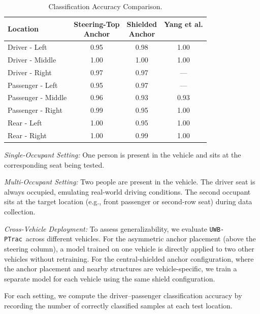 \documentclass[sigconf]{acmart}
\newcommand{\edited}[1]{#1}
\newcommand{\name}{{{\tt UWB-PTrac}}}
\newcommand{\vp}{\vspace{-1.5em}}
\begin{document}
\begin{table}[]
\small
\centering
\caption{Classification Accuracy Comparison.}
\label{tab:baseline_comparison}
\vp
\begin{tabular}{|l|c|c|c|}
\hline
\textbf{Location} & \makecell[c]{Steering-Top\\Anchor} & \makecell[c]{Shielded\\Anchor} & \makecell[c]{\textbf{Yang et al.}\\~\cite{yang2011detecting}} \\ \hline
Driver - Left & 0.95 & 0.98 & 1.00 \\
Driver - Middle & 1.00 & 1.00 & 1.00 \\
Driver - Right & 0.97 & 0.97 & --- \\ \hline
Passenger - Left & 0.95 & 0.97 & --- \\
Passenger - Middle & 0.96 & 0.93 & 0.93 \\
Passenger - Right & 0.99 & 0.95 & 1.00 \\ \hline
Rear - Left & 1.00 & 0.95 & 1.00 \\
Rear - Right & 1.00 & 0.99 & 1.00 \\ \hline
\end{tabular}
\vspace{-2em}
\end{table}

\textit{Single-Occupant Setting:} One person is present in the vehicle and sits 
at the corresponding seat being tested. 

\textit{Multi-Occupant Setting:} Two people are present in the vehicle. 
The driver seat is always occupied, emulating real-world driving conditions. 
The second occupant sits at the target location (e.g., front passenger or
second-row seat) during data collection.

\textit{Cross-Vehicle Deployment:} To assess generalizability, we evaluate 
\name\ across different vehicles.
%
For the asymmetric anchor placement (above the steering column), a model 
trained on one vehicle is directly applied to two other vehicles
without retraining.
%
For the central-shielded anchor configuration, where the anchor 
placement and nearby structures are vehicle-specific, we train a separate model for each vehicle 
using the same shield configuration.

For each setting, we compute the \edited{driver--passenger} classification accuracy by
recording the number of correctly classified samples at each test location.
\end{document}

